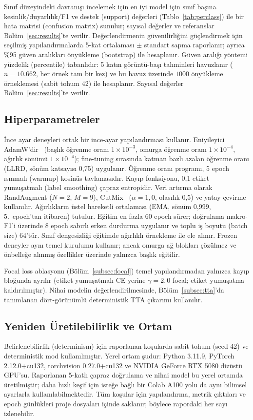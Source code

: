 Sınıf düzeyindeki davranışı incelemek için en iyi model için sınıf başına
kesinlik/duyarlılık/F1 ve destek (support) değerleri (Tablo~\ref{tab:perclass})
ile bir hata
matrisi (confusion matrix) sunulur; sayısal değerler ve referanslar
Bölüm~\ref{sec:results}'te verilir.
Değerlendirmenin güvenilirliğini güçlendirmek için seçilmiş yapılandırmalarda
5-kat ortalaması $\pm$ standart sapma raporlanır; ayrıca \%95 güven aralıkları
önyükleme (bootstrap) ile hesaplanır. Güven aralığı yöntemi yüzdelik
(percentile) tabanlıdır: 5 katın görüntü-başı tahminleri havuzlanır
($n = 10{.}662$, her örnek tam bir kez) ve bu havuz üzerinde $1000$ önyükleme
örneklemesi (sabit tohum 42) ile hesaplanır. Sayısal değerler
Bölüm~\ref{sec:results}'te verilir.

\subsection{Hiperparametreler}
\label{subsec:hyperparams}
İnce ayar deneyleri ortak bir ince-ayar yapılandırması kullanır.
Eniyileyici AdamW'dir~\cite{loshchilov2019adamw} (başlık öğrenme oranı
$1\times10^{-3}$, omurga öğrenme oranı $1\times10^{-4}$, ağırlık sönümü
$1\times10^{-4}$); fine-tuning sırasında katman bazlı azalan öğrenme oranı
(LLRD, sönüm katsayısı 0,75) uygulanır. Öğrenme oranı programı, 5 epoch ısınmalı
(warmup) kosinüs tavlamasıdır. Kayıp fonksiyonu, 0,1 etiket yumuşatmalı (label
smoothing) çapraz entropidir. Veri artırma olarak RandAugment ($N{=}2$, $M{=}9$),
CutMix~\cite{yun2019cutmix} ($\alpha{=}1{,}0$, olasılık 0,5) ve yatay çevirme
kullanılır. Ağırlıkların üstel hareketli ortalaması (EMA, sönüm 0,999, 5.\
epoch'tan itibaren) tutulur. Eğitim en fazla 60 epoch sürer; doğrulama
makro-F1'i üzerinde 8 epoch sabırlı erken durdurma uygulanır ve toplu iş boyutu
(batch size) 64'tür. Sınıf dengesizliği eğitimde ağırlıklı örnekleme ile ele
alınır. Frozen deneyler aynı temel kurulumu kullanır; ancak omurga ağ blokları
çözülmez ve önbelleğe alınmış özellikler üzerinde yalnızca başlık eğitilir.

Focal loss ablasyonu (Bölüm~\ref{subsec:focal}) temel yapılandırmadan yalnızca
kayıp bloğunda ayrılır (etiket yumuşatmalı CE yerine $\gamma{=}2{,}0$ focal;
etiket yumuşatma kaldırılmıştır). Nihai modelin değerlendirilmesinde,
Bölüm~\ref{subsec:tta}'da tanımlanan dört-görünümlü deterministik TTA çıkarımı
kullanılır.

\subsection{Yeniden Üretilebilirlik ve Ortam}
\label{subsec:repro}
Belirlenebilirlik (determinism) için raporlanan koşularda sabit tohum (seed 42)
ve deterministik mod kullanılmıştır. Yerel ortam şudur: Python 3.11.9, PyTorch
2.12.0+cu132, torchvision 0.27.0+cu132 ve NVIDIA GeForce RTX 5080 dizüstü GPU'su.
Raporlanan 5-katlı çapraz doğrulama ve nihai model bu yerel ortamda üretilmiştir;
daha hızlı keşif için isteğe bağlı bir Colab A100 yolu da aynı bilimsel ayarlarla
kullanılabilmektedir. Tüm koşular için yapılandırma, metrik çıktıları ve epoch
günlükleri proje dosyaları içinde saklanır; böylece rapordaki her sayı
izlenebilir.
